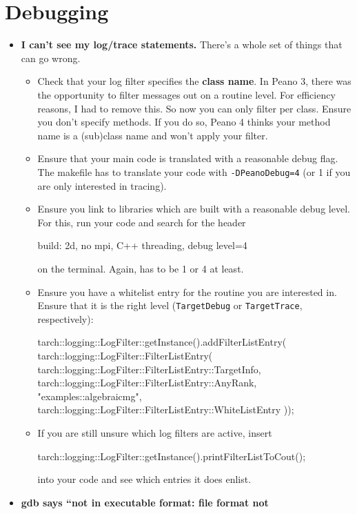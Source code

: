 \section{Debugging}
\begin{itemize}
  \item \textbf{I can't see my log/trace statements.} There's a whole set of
    things that can go wrong.
    \begin{itemize}
      \item Check that your log filter specifies the {\bf class name}. In Peano
      3, there was the opportunity to filter messages out on a routine level.
      For efficiency reasons, I had to remove this. So now you can only filter
      per class. Ensure you don't specify methods. If you do so, Peano 4 thinks
      your method name is a (sub)class name and won't apply your filter.
      \item Ensure that your main code is translated with
      a reasonable debug flag. The makefile has to translate your code with
      \texttt{-DPeanoDebug=4} (or 1 if you are only interested in tracing).
      \item     Ensure you link to libraries which are built with a reasonable debug level. 
    For this, run your code and search for the header
    \begin{code}
build: 2d, no mpi, C++ threading, debug level=4
    \end{code}
    on the terminal. Again, has to be 1 or 4 at least.
    \item Ensure you have a
    whitelist entry for the routine you are interested in. Ensure that it is the
    right level (\texttt{TargetDebug} or \texttt{TargetTrace}, respectively):
    \begin{code}
tarch::logging::LogFilter::getInstance().addFilterListEntry( tarch::logging::LogFilter::FilterListEntry(
  tarch::logging::LogFilter::FilterListEntry::TargetInfo,
  tarch::logging::LogFilter::FilterListEntry::AnyRank,
  "examples::algebraicmg",
  tarch::logging::LogFilter::FilterListEntry::WhiteListEntry
));
    \end{code}
    \item If you are still unsure which log filters are active, insert
    \begin{code}
tarch::logging::LogFilter::getInstance().printFilterListToCout();
    \end{code}
    into your code and see which entries it does enlist.
  \end{itemize}
  \item \textbf{gdb says ``not in executable format: file format not
}
\end{itemize}

